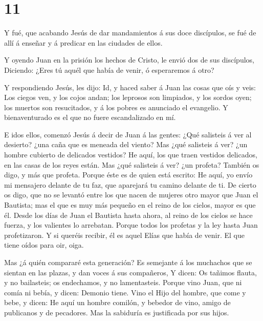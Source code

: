 \hypertarget{section-10}{%
\section{11}\label{section-10}}

 Y fué, que acabando Jesús de dar mandamientos á sus doce
discípulos, se fué de allí á enseñar y á predicar en las ciudades de
ellos.

 Y oyendo Juan en la prisión los hechos de Cristo, le envió
dos de sus discípulos,  Diciendo: ¿Eres tú aquél que había
de venir, ó esperaremos á otro?

 Y respondiendo Jesús, les dijo: Id, y haced saber á Juan
las cosas que oís y veis:  Los ciegos ven, y los cojos
andan; los leprosos son limpiados, y los sordos oyen; los muertos son
resucitados, y á los pobres es anunciado el evangelio.  Y
bienaventurado es el que no fuere escandalizado en mí.

 E idos ellos, comenzó Jesús á decir de Juan á las gentes:
¿Qué salisteis á ver al desierto? ¿una caña que es meneada del viento?
 Mas ¿qué salisteis á ver? ¿un hombre cubierto de delicados
vestidos? He aquí, los que traen vestidos delicados, en las casas de los
reyes están.  Mas ¿qué salisteis á ver? ¿un profeta? También
os digo, y más que profeta.  Porque éste es de quien está
escrito: He aquí, yo envío mi mensajero delante de tu faz, que aparejará
tu camino delante de ti.  De cierto os digo, que no se
levantó entre los que nacen de mujeres otro mayor que Juan el Bautista;
mas el que es muy más pequeño en el reino de los cielos, mayor es que
él.  Desde los días de Juan el Bautista hasta ahora, al
reino de los cielos se hace fuerza, y los valientes lo arrebatan.
 Porque todos los profetas y la ley hasta Juan
profetizaron.  Y si queréis recibir, él es aquel Elías que
había de venir.  El que tiene oídos para oir, oiga.

 Mas ¿á quién compararé esta generación? Es semejante á los
muchachos que se sientan en las plazas, y dan voces á sus compañeros,
 Y dicen: Os tañimos flauta, y no bailasteis; os
endechamos, y no lamentasteis.  Porque vino Juan, que ni
comía ni bebía, y dicen: Demonio tiene.  Vino el Hijo del
hombre, que come y bebe, y dicen: He aquí un hombre comilón, y bebedor
de vino, amigo de publicanos y de pecadores. Mas la sabiduría es
justificada por sus hijos.


